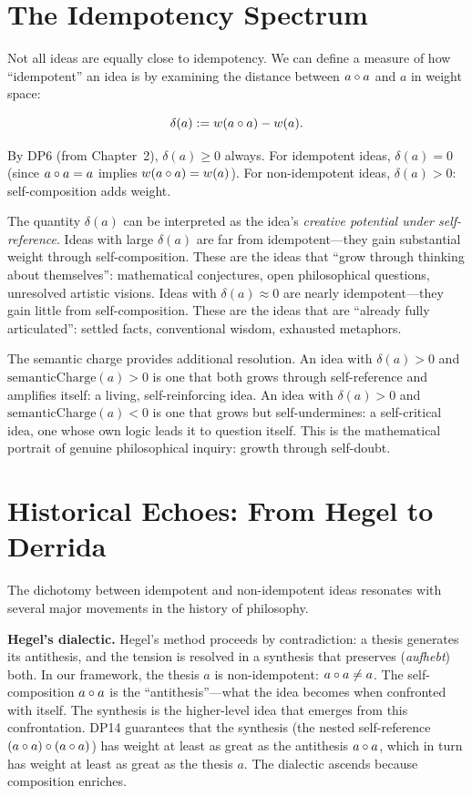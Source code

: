 \section{The Idempotency Spectrum}

Not all ideas are equally close to idempotency. We can define a measure
of how ``idempotent'' an idea is by examining the distance between
$a \circ a$ and $a$ in weight space:

\[
\delta(a) := w(a \circ a) - w(a).
\]

By DP6 (from Chapter~2), $\delta(a) \geq 0$ always. For idempotent
ideas, $\delta(a) = 0$ (since $a \circ a = a$ implies
$w(a \circ a) = w(a)$). For non-idempotent ideas, $\delta(a) > 0$:
self-composition adds weight.

The quantity $\delta(a)$ can be interpreted as the idea's
\emph{creative potential under self-reference}. Ideas with large
$\delta(a)$ are far from idempotent---they gain substantial weight
through self-composition. These are the ideas that ``grow through
thinking about themselves'': mathematical conjectures, open philosophical
questions, unresolved artistic visions. Ideas with $\delta(a) \approx 0$
are nearly idempotent---they gain little from self-composition. These
are the ideas that are ``already fully articulated'': settled facts,
conventional wisdom, exhausted metaphors.

The semantic charge provides additional resolution. An idea with
$\delta(a) > 0$ and $\mathrm{semanticCharge}(a) > 0$ is one that both
grows through self-reference and amplifies itself: a living,
self-reinforcing idea. An idea with $\delta(a) > 0$ and
$\mathrm{semanticCharge}(a) < 0$ is one that grows but
self-undermines: a self-critical idea, one whose own logic leads it
to question itself. This is the mathematical portrait of genuine
philosophical inquiry: growth through self-doubt.

\section{Historical Echoes: From Hegel to Derrida}

The dichotomy between idempotent and non-idempotent ideas resonates
with several major movements in the history of philosophy.

\textbf{Hegel's dialectic.} Hegel's method proceeds by contradiction:
a thesis generates its antithesis, and the tension is resolved in a
synthesis that preserves (\textit{aufhebt}) both. In our framework, the
thesis $a$ is non-idempotent: $a \circ a \neq a$. The
self-composition $a \circ a$ is the ``antithesis''---what the idea
becomes when confronted with itself. The synthesis is the higher-level
idea that emerges from this confrontation. DP14 guarantees that the
synthesis (the nested self-reference
$(a \circ a) \circ (a \circ a)$) has weight at least as great
as the antithesis $a \circ a$, which in turn has weight at least as
great as the thesis $a$. The dialectic ascends because composition
enriches.

